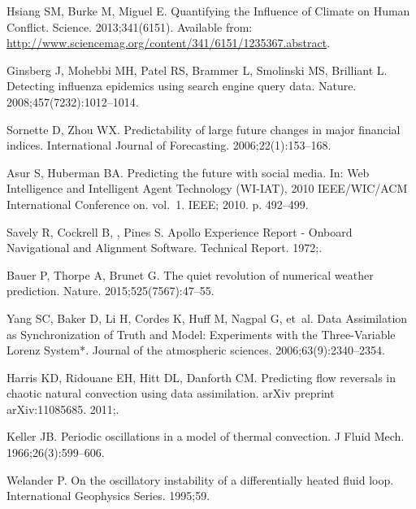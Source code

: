\documentclass[10pt,letterpaper]{article}
\begin{document}
\clearpage
\pagebreak

\begin{thebibliography}{10}

Hsiang SM, Burke M, Miguel E.
\newblock Quantifying the Influence of Climate on Human Conflict.
\newblock Science. 2013;341(6151).
\newblock Available from:
  \url{http://www.sciencemag.org/content/341/6151/1235367.abstract}.

Ginsberg J, Mohebbi MH, Patel RS, Brammer L, Smolinski MS, Brilliant L.
\newblock Detecting influenza epidemics using search engine query data.
\newblock Nature. 2008;457(7232):1012--1014.

Sornette D, Zhou WX.
\newblock Predictability of large future changes in major financial indices.
\newblock International Journal of Forecasting. 2006;22(1):153--168.

Asur S, Huberman BA.
\newblock Predicting the future with social media.
\newblock In: Web Intelligence and Intelligent Agent Technology (WI-IAT), 2010
  IEEE/WIC/ACM International Conference on. vol.~1. IEEE; 2010. p. 492--499.

Savely R, Cockrell B, , Pines S.
\newblock Apollo Experience Report - Onboard Navigational and Alignment
  Software.
\newblock Technical Report. 1972;.

Bauer P, Thorpe A, Brunet G.
\newblock The quiet revolution of numerical weather prediction.
\newblock Nature. 2015;525(7567):47--55.

Yang SC, Baker D, Li H, Cordes K, Huff M, Nagpal G, et~al.
\newblock Data Assimilation as Synchronization of Truth and Model: Experiments
  with the Three-Variable Lorenz System*.
\newblock Journal of the atmospheric sciences. 2006;63(9):2340--2354.

Harris KD, Ridouane EH, Hitt DL, Danforth CM.
\newblock Predicting flow reversals in chaotic natural convection using data
  assimilation.
\newblock arXiv preprint arXiv:11085685. 2011;.

Keller JB.
\newblock Periodic oscillations in a model of thermal convection.
\newblock J Fluid Mech. 1966;26(3):599--606.

Welander P.
\newblock On the oscillatory instability of a differentially heated fluid loop.
\newblock International Geophysics Series. 1995;59.


\end{thebibliography}
\end{document}
